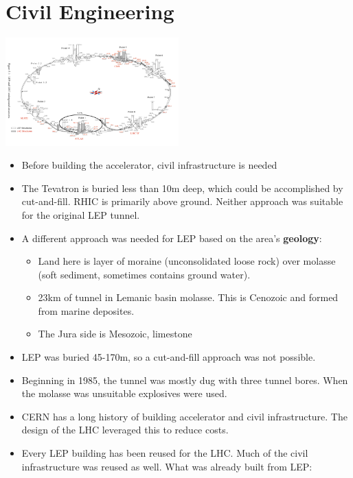 \section{Civil Engineering}
\begin{center}
\includegraphics[width=0.5\textwidth]{figures/notes-experiment/lhcLepLayout.png}
\end{center}
\begin{itemize}
    \item Before building the accelerator, civil infrastructure is needed
    \item The Tevatron is buried less than 10m deep, which could be accomplished by cut-and-fill. RHIC is primarily above ground. Neither approach was suitable for the original LEP tunnel. 
    \item A different approach was needed for LEP based on the area's \textbf{geology}:
    \begin{itemize}\scriptsize
        \item Land here is layer of moraine (unconsolidated loose rock) over molasse (soft sediment, sometimes contains ground water). \cite{lhcDesignV2}
        \item 23km of tunnel in Lemanic basin molasse. This is Cenozoic and formed from marine deposites. \cite{lhcDesignV2}
        \item The Jura side is Mesozoic, limestone \cite{lhcDesignV2}
    \end{itemize}
    \item LEP was buried 45-170m, so a cut-and-fill approach was not possible.
    \item Beginning in 1985, the tunnel was mostly dug with three tunnel bores. When the molasse was unsuitable explosives were used.
    \item CERN has a long history of building accelerator and civil infrastructure. The design of the LHC leveraged this to reduce costs.
    \item Every LEP building has been reused for the LHC. Much of the civil infrastructure was reused as well. What was already built from LEP:
    \begin{itemize}\scriptsize

\end{itemize}
\end{itemize}
